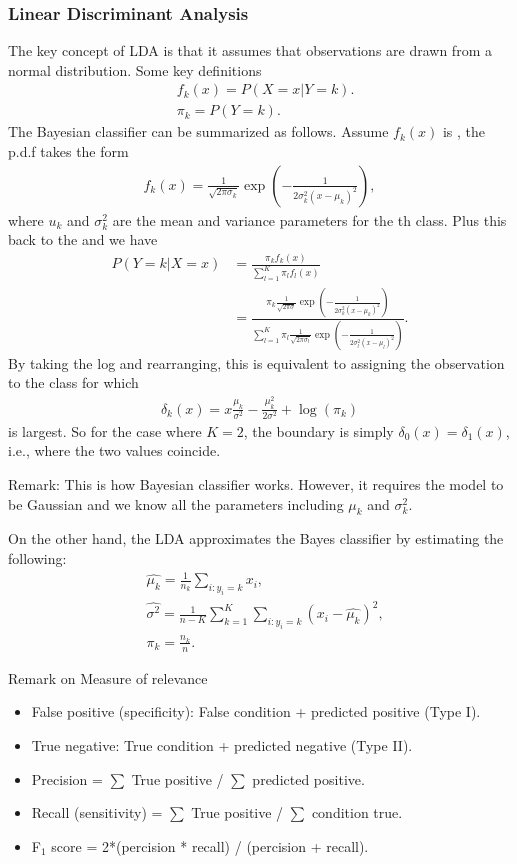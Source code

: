 \subsubsection{Linear Discriminant Analysis}
The key concept of LDA is that it assumes that observations are drawn from a normal distribution. Some key definitions
\begin{align}
&f_k(x) = P(X=x|Y=k).\\
&\pi_k = P(Y=k).
\end{align}
The Bayesian classifier can be summarized as follows. Assume $f_k(x)$ is , the p.d.f takes the form
\begin{align}
f_k(x) = \frac{1}{\sqrt{2\pi\sigma_k}}\exp(-\frac{1}{2\sigma^2_k(x-\mu_k)^2}),
\end{align}
where $u_k$ and $\sigma_k^2$ are the mean and variance parameters for the th class.
Plus this back to the  and we have
\begin{align}
P(Y=k|X=x) &= \frac{\pi_kf_k(x)}{\sum_{l=1}^{K}\pi_lf_l(x)} \\
& = \frac{\pi_k\frac{1}{\sqrt{2\pi\sigma}}\exp(-\frac{1}{2\sigma^2_k(x-\mu_k)^2})}{\sum_{l=1}^{K}\pi_l\frac{1}{\sqrt{2\pi\sigma_l}}\exp(-\frac{1}{2\sigma^2_l(x-\mu_l)^2})}.
\end{align}
By taking the log and rearranging, this is equivalent to assigning the observation to the class for which
\begin{align}
\delta_k(x) = x\frac{\mu_k}{\sigma^2}-\frac{\mu_k^2}{2\sigma^2} + \log(\pi_k)
\end{align}
is largest. So for the case where $K=2$, the boundary is simply $\delta_0(x) = \delta_1(x)$, i.e., where the two values coincide.
\begin{tbox}
Remark: This is how Bayesian classifier works. However, it requires the model to be Gaussian and we know all the parameters including $\mu_k$ and $\sigma_k^2$.
\end{tbox}
On the other hand, the LDA approximates the Bayes classifier by estimating the following:
\begin{align}
&\hat{\mu_k} = \frac{1}{n_k}\sum_{i:y_i=k}x_i, \\
&\hat{\sigma^2} = \frac{1}{n-K}\sum_{k=1}^K \sum_{i:y_i=k}(x_i - \hat{\mu_k})^2, \\
&\pi_k = \frac{n_k}{n}.
\end{align}
\begin{tbox}
Remark on Measure of relevance
\begin{itemize}
	\item False positive (specificity): False condition + predicted positive (Type I).
	\item True negative: True condition + predicted negative (Type II).
	\item Precision = $\sum$ True positive / $\sum$ predicted positive.
	\item Recall (sensitivity) =  $\sum$ True positive / $\sum$ condition true.
	\item F$_1$ score = 2*(percision * recall) / (percision + recall).
\end{itemize}
\end{tbox}
